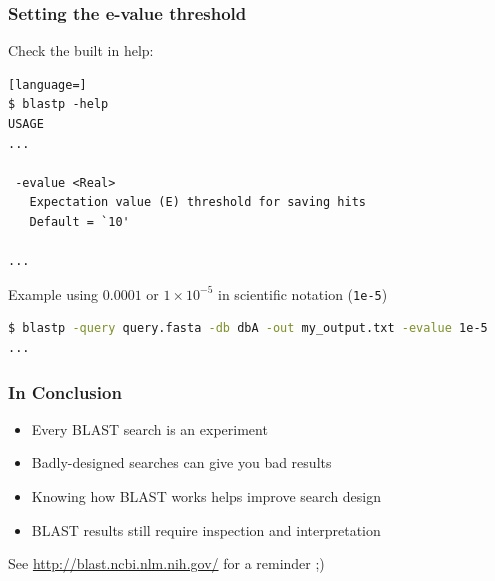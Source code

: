 \documentclass[table]{beamer}
\begin{document}
\begin{frame}[fragile]
\frametitle{Setting the e-value threshold}

Check the built in help:
\begin{lstlisting}[language=]
$ blastp -help
USAGE
...

 -evalue <Real>
   Expectation value (E) threshold for saving hits
   Default = `10'

...
\end{lstlisting}

Example using $0.0001$ or $1 \times 10^{-5}$ in scientific notation (\texttt{1e-5})
\begin{lstlisting}[language=sh]
$ blastp -query query.fasta -db dbA -out my_output.txt -evalue 1e-5
...
\end{lstlisting}
\end{frame}
     
    \begin{frame}
     \frametitle{In Conclusion}
     \begin{itemize}
       \item Every BLAST search is an experiment
       \item Badly-designed searches can give you bad results
       \item Knowing how BLAST works helps improve search design
       \item BLAST results still require inspection and interpretation
     \end{itemize}
     See \url{http://blast.ncbi.nlm.nih.gov/} for a reminder ;)
    \end{frame}     
     
    
\end{document}
